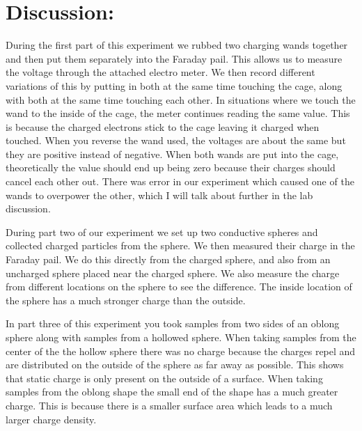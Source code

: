 \documentclass{article}
\begin{document}
\section*{Discussion:}
\doublespace
During the first part of this experiment we rubbed two charging wands together and then put them separately into the Faraday pail.  This allows us to measure the voltage through the attached electro meter.  We then record different variations of this by putting in both at the same time touching the cage, along with both at the same time touching each other.  In situations where we touch the wand to the inside of the cage, the meter continues reading the same value.  This is because the charged electrons stick to the cage leaving it charged when touched.  When you reverse the wand used, the voltages are about the same but they are positive instead of negative.  When both wands are put into the cage, theoretically the value should end up being zero because their charges should cancel each other out.  There was error in our experiment which caused one of the wands to overpower the other, which I will talk about further in the lab discussion.    \par

During part two of our experiment we set up two conductive spheres and collected charged particles from the sphere.  We then measured their charge in the Faraday pail.  We do this directly from the charged sphere, and also from an uncharged sphere placed near the charged sphere.  We also measure the charge from different locations on the sphere to see the difference.  The inside location of the sphere has a much stronger charge than the outside. \par 

In part three of this experiment you took samples from two sides of an oblong sphere along with samples from a hollowed sphere.  When taking samples from the center of the the hollow sphere there was no charge because the charges repel and are distributed on the outside of the sphere as far away as possible.  This shows that static charge is only present on the outside of a surface.  When taking samples from the oblong shape the small end of the shape has a much greater charge.  This is because there is a smaller surface area which leads to a much larger charge density.  \par 
\end{document}
